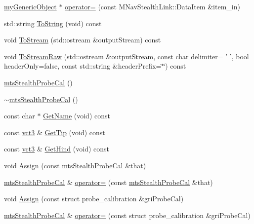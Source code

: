 \begin{DoxyCompactItemize}
\hyperlink{classmy_generic_object}{my\-Generic\-Object} $\ast$ \hyperlink{classmts_stealth_probe_cal_ac9426e0e33a2439962ce6499976441df}{operator=} (const M\-Nav\-Stealth\-Link\-::\-Data\-Item \&item\-\_\-in)
\item 
std\-::string \hyperlink{classmts_stealth_probe_cal_a004a8c73e318b8357ba895e24c598879}{To\-String} (void) const 
\item 
void \hyperlink{classmts_stealth_probe_cal_a8269e2a53a6d7855c7385873c1a74a0e}{To\-Stream} (std\-::ostream \&output\-Stream) const 
\item 
void \hyperlink{classmts_stealth_probe_cal_a7399576b98cc2bb01a68628d7c1d93f9}{To\-Stream\-Raw} (std\-::ostream \&output\-Stream, const char delimiter= ' ', bool header\-Only=false, const std\-::string \&header\-Prefix=\char`\"{}\char`\"{}) const 
\item 
\hyperlink{classmts_stealth_probe_cal_a23a543dfab9d3e23f83078f7356c01c2}{mts\-Stealth\-Probe\-Cal} ()
\item 
\hyperlink{classmts_stealth_probe_cal_a7d648415188646162fde6fd4e7c198e2}{$\sim$mts\-Stealth\-Probe\-Cal} ()
\item 
const char $\ast$ \hyperlink{classmts_stealth_probe_cal_ac5d897e409c52bb39b0609be832b5280}{Get\-Name} (void) const 
\item 
const \hyperlink{vct_fixed_size_vector_types_8h_a3af82acdbf4eeb73c551909240b106ea}{vct3} \& \hyperlink{classmts_stealth_probe_cal_aef0ca077dd8812b6f8686216b649fc7e}{Get\-Tip} (void) const 
\item 
const \hyperlink{vct_fixed_size_vector_types_8h_a3af82acdbf4eeb73c551909240b106ea}{vct3} \& \hyperlink{classmts_stealth_probe_cal_abed5877dd697b53d5010c86b3c1637ec}{Get\-Hind} (void) const 
\item 
void \hyperlink{classmts_stealth_probe_cal_a1d42d1f6f752c03028a4880b1463d77d}{Assign} (const \hyperlink{classmts_stealth_probe_cal}{mts\-Stealth\-Probe\-Cal} \&that)
\item 
\hyperlink{classmts_stealth_probe_cal}{mts\-Stealth\-Probe\-Cal} \& \hyperlink{classmts_stealth_probe_cal_a72ee5ec4d3d020c08fac6d97b369fad6}{operator=} (const \hyperlink{classmts_stealth_probe_cal}{mts\-Stealth\-Probe\-Cal} \&that)
\item 
void \hyperlink{classmts_stealth_probe_cal_a40d6ebfc91323afd2a504d03f82542d1}{Assign} (const struct probe\-\_\-calibration \&gri\-Probe\-Cal)
\item 
\hyperlink{classmts_stealth_probe_cal}{mts\-Stealth\-Probe\-Cal} \& \hyperlink{classmts_stealth_probe_cal_a01847095e7208b7ca2285e0530afbfed}{operator=} (const struct probe\-\_\-calibration \&gri\-Probe\-Cal)

\end{DoxyCompactItemize}

